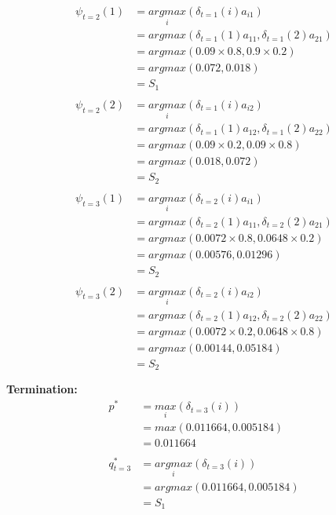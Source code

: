\documentclass[12pt]{article}
\begin{document}
\begin{equation}
	\begin{aligned}
		\psi_{t=2}(1)&=\underset{i}{argmax}(\delta_{t=1}(i)a_{i1}) \\
		&=argmax(\delta_{t=1}(1)a_{11}, \delta_{t=1}(2)a_{21}) \\
		&=argmax(0.09 \times 0.8, 0.9 \times 0.2) \\
		&=argmax(0.072, 0.018) \\
		&=S_1 \\ \\
		\psi_{t=2}(2)&=\underset{i}{argmax}(\delta_{t=1}(i)a_{i2}) \\
		&=argmax(\delta_{t=1}(1)a_{12}, \delta_{t=1}(2)a_{22}) \\
		&=argmax(0.09 \times 0.2, 0.09 \times 0.8) \\
		&=argmax(0.018, 0.072) \\
		&=S_2 \\ \\
		\psi_{t=3}(1)&=\underset{i}{argmax}(\delta_{t=2}(i)a_{i1}) \\
		&=argmax(\delta_{t=2}(1)a_{11}, \delta_{t=2}(2)a_{21}) \\
		&=argmax(0.0072 \times 0.8, 0.0648 \times 0.2) \\
		&=argmax(0.00576, 0.01296) \\
		&=S_2 \\ \\
		\psi_{t=3}(2)&=\underset{i}{argmax}(\delta_{t=2}(i)a_{i2}) \\
		&=argmax(\delta_{t=2}(1)a_{12}, \delta_{t=2}(2)a_{22}) \\
		&=argmax(0.0072 \times 0.2, 0.0648 \times 0.8) \\
		&=argmax(0.00144, 0.05184) \\
		&=S_2 \\ \\
	\end{aligned}
\end{equation}
\newpage
\textbf{Termination:}
\begin{equation}
	\begin{aligned}
		p^*&=\underset{i}{max}(\delta_{t=3}(i)) \\
		&=max(0.011664, 0.005184) \\
		&=0.011664 \\ \\
		q_{t=3}^*&=\underset{i}{argmax}(\delta_{t=3}(i)) \\
		&=argmax(0.011664, 0.005184) \\
		&=S_1 \\ \\
	\end{aligned}
\end{equation}
\end{document}
